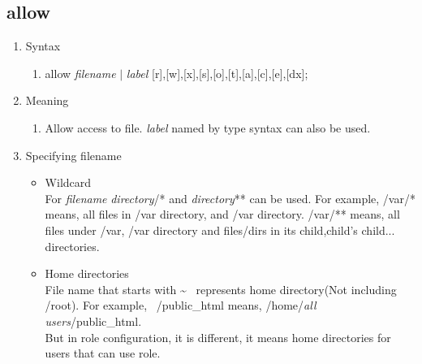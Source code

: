 \documentclass{article}
\begin{document}
\subsection{allow}\label{section:allow}
 \begin{enumerate}
  \item Syntax
	\begin{enumerate}
	 \item allow {\it filename} $\mid$ {\it label} [r],[w],[x],[s],[o],[t],[a],[c],[e],[dx];
	\end{enumerate}
  \item Meaning\\
	\begin{enumerate}
	 \item  Allow access to file. {\it label} named by type syntax can also be used.
	\end{enumerate}
  \item Specifying filename\\
	\begin{itemize}
	 \item Wildcard\\
	       For {\it filename} {\it directory}/* and {\it directory}** can
	be used.  For example, /var/* means, all files in /var
	directory, and /var directory. /var/** means, all files under
	/var, /var directory and files/dirs in its
	child,child's child... 	directories.
	 \item Home directories\\
	       File name that starts with  \textasciitilde ~ represents
	       home directory(Not including /root).
	       For example, ~/public\_html means,
	       /home/{\it all users}/public\_html.\\
	       But in role configuration, it is different, it means home directories for users that can use role.

	\end{itemize}


\end{enumerate}
\end{document}
